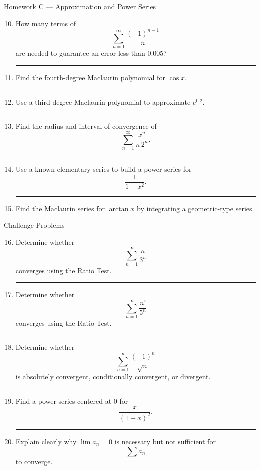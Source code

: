 \documentclass[11pt]{article}
\newcommand{\hwspace}{\vspace{0.8em}\hrule\vspace{0.8em}}
\begin{document}
\newpage
\begin{homeworkset}{Homework C --- Approximation and Power Series}
\begin{enumerate}
\setcounter{enumi}{9}
    \item How many terms of
    \[
    \sum_{n=1}^{\infty}\frac{(-1)^{n-1}}{n}
    \]
    are needed to guarantee an error less than \(0.005\)?
    \hwspace

    \item Find the fourth-degree Maclaurin polynomial for \(\cos x\).
    \hwspace

    \item Use a third-degree Maclaurin polynomial to approximate \(e^{0.2}\).
    \hwspace

    \item Find the radius and interval of convergence of
    \[
    \sum_{n=1}^{\infty}\frac{x^n}{n\,2^n}.
    \]
    \hwspace

    \item Use a known elementary series to build a power series for
    \[
    \frac{1}{1+x^2}.
    \]
    \hwspace

    \item Find the Maclaurin series for \(\arctan x\) by integrating a geometric-type series.
\end{enumerate}
\end{homeworkset}
\newpage
\begin{homeworkset}{Challenge Problems}
\begin{enumerate}
\setcounter{enumi}{15}
    \item Determine whether
    \[
    \sum_{n=1}^{\infty}\frac{n}{3^n}
    \]
    converges using the Ratio Test.
    \hwspace

    \item Determine whether
    \[
    \sum_{n=1}^{\infty}\frac{n!}{5^n}
    \]
    converges using the Ratio Test.
    \hwspace

    \item Determine whether
    \[
    \sum_{n=1}^{\infty}\frac{(-1)^n}{\sqrt n}
    \]
    is absolutely convergent, conditionally convergent, or divergent.
    \hwspace

    \item Find a power series centered at \(0\) for
    \[
    \frac{x}{(1-x)^2}.
    \]
    \hwspace

    \item Explain clearly why \(\lim a_n=0\) is necessary but not sufficient for
    \[
    \sum a_n
    \]
    to converge.
\end{enumerate}
\end{homeworkset}
\end{document}
